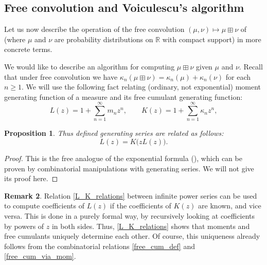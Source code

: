 \documentclass[letterpaper,11pt,oneside,reqno]{amsart}
\numberwithin{equation}{section}
\newtheorem{proposition}{Proposition}[section]
\theoremstyle{definition}
\newtheorem{remark}[proposition]{Remark}
\begin{document}

\subsection{Free convolution and Voiculescu's algorithm} %
\label{sub:free_convolution_and_voiculescu_s_algorithm}

Let us now describe the operation of the free convolution $(\mu,\nu)\mapsto \mu\boxplus \nu$
of 
(where $\mu$ and $\nu$ are probability distributions on $\mathbb{R}$ with compact
support) in more concrete terms.

We would like to describe an algorithm for computing $\mu\boxplus \nu$ given $\mu$ and $\nu$.
Recall that under free convolution we have $\kappa_n(\mu\boxplus\nu)=\kappa_n(\mu)+\kappa_n(\nu)$ for each $n\ge1$. 
We will use the following fact relating (ordinary, not exponential) moment generating function of a measure
and its free cumulant generating function:
\begin{equation}\label{L_K_definitions}
	L(z)=1+\sum_{n=1}^\infty m_nz^n,\qquad
	K(z)=1+\sum_{n=1}^\infty \kappa_nz^n,
\end{equation}
\begin{proposition}\label{prop:free_expon_thm}
	Thus defined generating series are related as follows:
	\begin{equation}\label{L_K_relations}
		L(z)=K\big(zL(z)\big).
	\end{equation}
\end{proposition}
\begin{proof}
	This is the free analogue of the exponential formula (),
	which can be proven by combinatorial manipulations with generating series.
	We will not give its proof here.
\end{proof}
\begin{remark}\label{rmk:L_K_inversion_exists}
	Relation \eqref{L_K_relations} between infinite power series can be used to compute coefficients
	of $L(z)$ if the coefficients of $K(z)$ are known, and vice versa. This is done in a purely formal way,
	by recursively looking at coefficients by powers of $z$ in both sides. Thus, \eqref{L_K_relations} 
	shows that moments and free cumulants uniquely determine each other.
	Of course, this uniqueness already follows from the combinatorial relations 
	\eqref{free_cum_def} and \eqref{free_cum_via_mom}. 
\end{remark}
\end{document}
